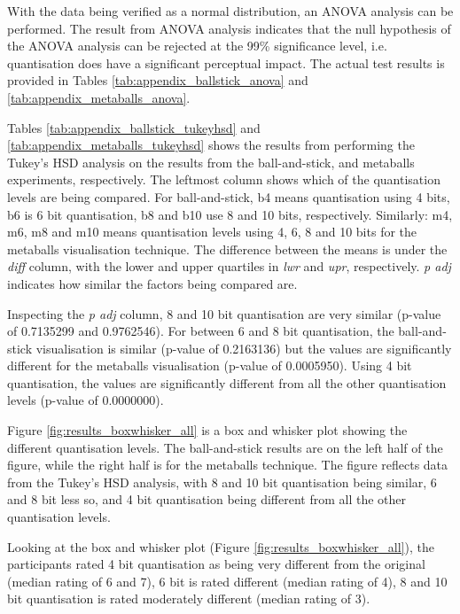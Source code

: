 With the data being verified as a normal distribution, an ANOVA analysis can be
performed. The result from ANOVA analysis indicates that the null hypothesis of
the ANOVA analysis can be rejected at the 99\% significance level, i.e.
quantisation does have a significant perceptual impact. The actual test results
is provided in Tables \ref{tab:appendix_ballstick_anova} and
\ref{tab:appendix_metaballs_anova}.

Tables \ref{tab:appendix_ballstick_tukeyhsd} and
\ref{tab:appendix_metaballs_tukeyhsd} shows the results from performing the
Tukey's HSD analysis on the results from the ball-and-stick, and metaballs
experiments, respectively. The leftmost column shows which of the quantisation
levels are being compared. For ball-and-stick, b4 means quantisation using 4
bits, b6 is 6 bit quantisation, b8 and b10 use 8 and 10 bits, respectively.
Similarly: m4, m6, m8 and m10 means quantisation levels using 4, 6, 8 and 10
bits for the metaballs visualisation technique. The difference between the
means is under the \emph{diff} column, with the lower and upper quartiles in
\emph{lwr} and \emph{upr}, respectively. \emph{p adj} indicates how similar the
factors being compared are.

Inspecting the \emph{p adj} column, 8 and 10 bit quantisation are very similar
(p-value of 0.7135299 and 0.9762546). For between 6 and 8 bit quantisation, the
ball-and-stick visualisation is similar (p-value of 0.2163136) but the values
are significantly different for the metaballs visualisation (p-value of
0.0005950). Using 4 bit quantisation, the values are significantly different
from all the other quantisation levels (p-value of 0.0000000).

Figure \ref{fig:results_boxwhisker_all} is a box and whisker plot showing the
different quantisation levels. The ball-and-stick results are on the left half
of the figure, while the right half is for the metaballs technique. The figure
reflects data from the Tukey's HSD analysis, with 8 and 10 bit quantisation
being similar, 6 and 8 bit less so, and 4 bit quantisation being different from
all the other quantisation levels.

Looking at the box and whisker plot (Figure \ref{fig:results_boxwhisker_all}),
the participants rated 4 bit quantisation as being very different from the
original (median rating of 6 and 7), 6 bit is rated different (median rating of
4), 8 and 10 bit quantisation is rated moderately different (median rating of
3).

